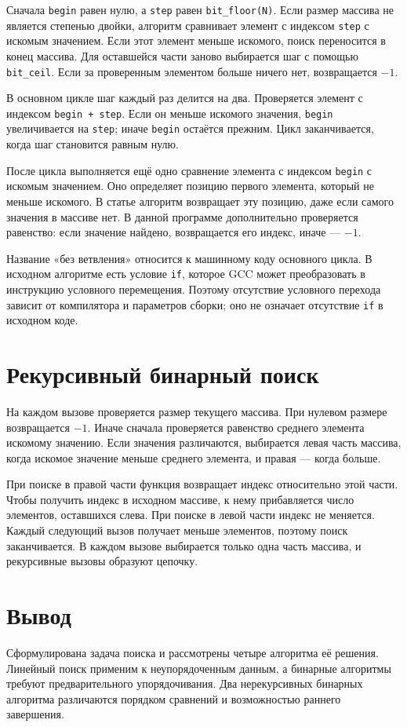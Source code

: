 Сначала \texttt{begin} равен нулю, а \texttt{step} равен \texttt{bit\_floor(N)}. Если размер массива не является степенью двойки, алгоритм сравнивает элемент с индексом \texttt{step} с искомым значением. Если этот элемент меньше искомого, поиск переносится в конец массива. Для оставшейся части заново выбирается шаг с помощью \texttt{bit\_ceil}. Если за проверенным элементом больше ничего нет, возвращается $-1$.

В основном цикле шаг каждый раз делится на два. Проверяется элемент с индексом \texttt{begin + step}. Если он меньше искомого значения, \texttt{begin} увеличивается на \texttt{step}; иначе \texttt{begin} остаётся прежним. Цикл заканчивается, когда шаг становится равным нулю.

После цикла выполняется ещё одно сравнение элемента с индексом \texttt{begin} с искомым значением. Оно определяет позицию первого элемента, который не меньше искомого. В статье алгоритм возвращает эту позицию, даже если самого значения в массиве нет. В данной программе дополнительно проверяется равенство: если значение найдено, возвращается его индекс, иначе --- $-1$.

Название «без ветвления» относится к машинному коду основного цикла. В исходном алгоритме есть условие \texttt{if}, которое GCC может преобразовать в инструкцию условного перемещения. Поэтому отсутствие условного перехода зависит от компилятора и параметров сборки; оно не означает отсутствие \texttt{if} в исходном коде.

\section{Рекурсивный бинарный поиск}
На каждом вызове проверяется размер текущего массива. При нулевом размере возвращается $-1$. Иначе сначала проверяется равенство среднего элемента искомому значению. Если значения различаются, выбирается левая часть массива, когда искомое значение меньше среднего элемента, и правая --- когда больше.

При поиске в правой части функция возвращает индекс относительно этой части. Чтобы получить индекс в исходном массиве, к нему прибавляется число элементов, оставшихся слева. При поиске в левой части индекс не меняется. Каждый следующий вызов получает меньше элементов, поэтому поиск заканчивается. В каждом вызове выбирается только одна часть массива, и рекурсивные вызовы образуют цепочку.

\section*{Вывод}
Сформулирована задача поиска и рассмотрены четыре алгоритма её решения. Линейный поиск применим к неупорядоченным данным, а бинарные алгоритмы требуют предварительного упорядочивания. Два нерекурсивных бинарных алгоритма различаются порядком сравнений и возможностью раннего завершения.
